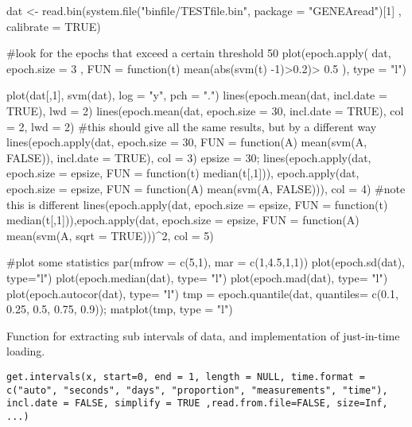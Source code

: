 \documentclass[a4paper]{book}
\begin{document}
%
\begin{Examples}
\begin{ExampleCode}

dat <- read.bin(system.file("binfile/TESTfile.bin", package = "GENEAread")[1]
    , calibrate = TRUE)

#look for the epochs that exceed a certain threshold 50%
plot(epoch.apply( dat, epoch.size = 3 , 
    FUN = function(t) mean(abs(svm(t) -1)>0.2)> 0.5 ), type = "l")

plot(dat[,1], svm(dat), log = "y", pch = ".")
lines(epoch.mean(dat, incl.date = TRUE), lwd = 2)
lines(epoch.mean(dat, epoch.size = 30, incl.date = TRUE), col = 2, lwd = 2)
#this should give all the same results, but by a different way
lines(epoch.apply(dat, epoch.size = 30, 
    FUN = function(A) mean(svm(A, FALSE)), incl.date = TRUE), col = 3)
epsize = 30; lines(epoch.apply(dat, epoch.size = epsize, 
    FUN = function(t) median(t[,1])), epoch.apply(dat, epoch.size = epsize, 
    FUN = function(A) mean(svm(A, FALSE))), col = 4)
#note this is different
lines(epoch.apply(dat, epoch.size = epsize, 
    FUN = function(t) median(t[,1])),epoch.apply(dat, epoch.size = epsize, 
    FUN = function(A) mean(svm(A, sqrt = TRUE)))^2, col = 5)

#plot some statistics
par(mfrow = c(5,1), mar = c(1,4.5,1,1))
plot(epoch.sd(dat), type="l")
plot(epoch.median(dat), type= "l")
plot(epoch.mad(dat), type= "l")
plot(epoch.autocor(dat), type= "l")
tmp = epoch.quantile(dat, quantiles= c(0.1, 0.25, 0.5, 0.75, 0.9)); matplot(tmp, type = "l")


\end{ExampleCode}
\end{Examples}
%
\begin{Description}\relax
Function for extracting sub intervals of data, and implementation of just-in-time loading.
\end{Description}
%
\begin{Usage}
\begin{verbatim}
get.intervals(x, start=0, end = 1, length = NULL, time.format = c("auto", "seconds", "days", "proportion", "measurements", "time"), incl.date = FALSE, simplify = TRUE ,read.from.file=FALSE, size=Inf, ...)
\end{verbatim}
\end{Usage}
\end{document}
